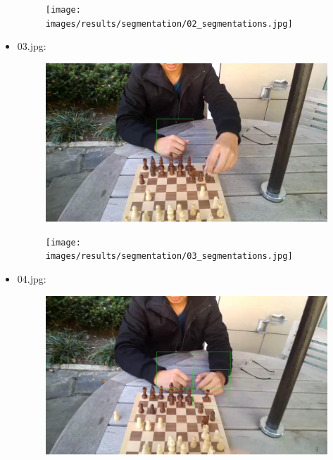 \begin{itemize}
\begin{figure}[!htb]
\begin{minipage}{0.5\textwidth}
            \end{minipage}\hfill
            \begin{minipage}{0.5\textwidth}
                \centering
                \texttt{[image: images/results/segmentation/02\_segmentations.jpg]}
            \end{minipage}
        \end{figure}
    \newpage
    \item 03.jpg:
        \begin{figure}[!htb]
            \begin{minipage}{0.5\textwidth}
                \centering
                \includegraphics[scale = 0.205]{images/results/detection/03_detections.jpg}
            \end{minipage}\hfill
            \begin{minipage}{0.5\textwidth}
                \centering
                \texttt{[image: images/results/segmentation/03\_segmentations.jpg]}
            \end{minipage}
        \end{figure}
    \item 04.jpg:
        \begin{figure}[!htb]
            \begin{minipage}{0.5\textwidth}
                \centering
                \includegraphics[scale = 0.205]{images/results/detection/04_detections.jpg}

\end{minipage}
\end{figure}
\end{itemize}
